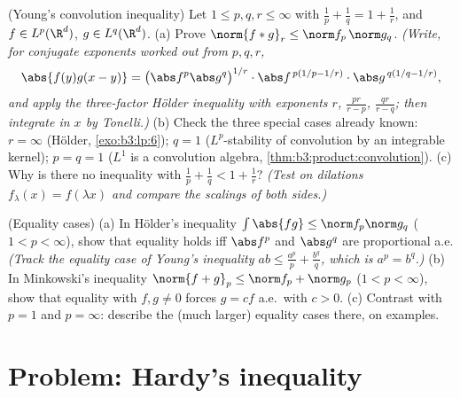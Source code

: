 \begin{exercise}[$\star\star\star$]\label{exo:b3:lp:11}
(Young's convolution inequality) Let $1 \leq p, q, r \leq
\infty$ with $\frac1p + \frac1q = 1 + \frac1r$, and $f \in
L^p(\R^d)$, $g \in L^q(\R^d)$.
(a) Prove $\norm{f * g}_r \leq \norm f_p\,\norm g_q$.
\emph{(Write, for conjugate exponents worked out from $p, q,
r$,
\[
\abs{f(y)g(x-y)} = \bigl(\abs f^p\abs g^q\bigr)^{1/r}
\cdot\abs f^{\,p(1/p - 1/r)}\cdot\abs g^{\,q(1/q - 1/r)},
\]
and apply the three-factor H\"older inequality with
exponents $r$, $\frac{pr}{r - p}$, $\frac{qr}{r - q}$; then
integrate in $x$ by Tonelli.)}
(b) Check the three special cases already known: $r =
\infty$ (H\"older, \cref{exo:b3:lp:6}); $q = 1$
($L^p$-stability of convolution by an integrable kernel);
$p = q = 1$ ($L^1$ is a convolution algebra,
\cref{thm:b3:product:convolution}).
(c) Why is there no inequality with $\frac1p + \frac1q < 1 +
\frac1r$? \emph{(Test on dilations $f_\lambda(x) =
f(\lambda x)$ and compare the scalings of both sides.)}
\end{exercise}

\begin{exercise}[$\star\star$]\label{exo:b3:lp:12}
(Equality cases) (a) In H\"older's inequality
$\int\abs{fg} \leq \norm f_p\norm g_q$ ($1 < p < \infty$),
show that equality holds iff $\abs f^p$ and $\abs g^q$ are
proportional a.e. \emph{(Track the equality case of Young's
inequality $ab \leq \frac{a^p}p + \frac{b^q}q$, which is $a^p
= b^q$.)}
(b) In Minkowski's inequality $\norm{f + g}_p \leq \norm f_p
+ \norm g_p$ ($1 < p < \infty$), show that equality with $f,
g \neq 0$ forces $g = cf$ a.e.\ with $c > 0$.
(c) Contrast with $p = 1$ and $p = \infty$: describe the
(much larger) equality cases there, on examples.
\end{exercise}

\section{Problem: Hardy's inequality}

